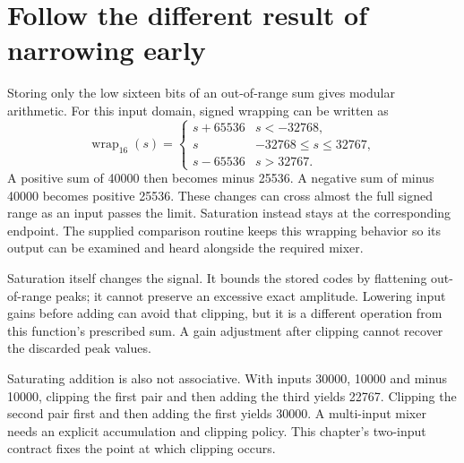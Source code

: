 \section{Follow the different result of narrowing early}\label{pcm-wrapping}
Storing only the low sixteen bits of an out-of-range sum gives modular arithmetic.
For this input domain, signed wrapping can be written as
\[
  \operatorname{wrap}_{16}(s)=
  \begin{cases}
    s+65536 & s<-32768,              \\
    s       & -32768\leq s\leq32767, \\
    s-65536 & s>32767.
  \end{cases}
\]
A positive sum of 40000 then becomes minus 25536. A negative sum of minus 40000
becomes positive 25536. These changes can cross almost the full signed range as
an input passes the limit. Saturation instead stays at the corresponding endpoint.
The supplied comparison routine keeps this wrapping behavior so its output can be
examined and heard alongside the required mixer.

Saturation itself changes the signal. It bounds the stored codes by flattening
out-of-range peaks; it cannot preserve an excessive exact amplitude. Lowering input
gains before adding can avoid that clipping, but it is a different operation from
this function's prescribed sum. A gain adjustment after clipping cannot recover
the discarded peak values.

Saturating addition is also not associative. With inputs 30000, 10000 and minus
10000, clipping the first pair and then adding the third yields 22767. Clipping
the second pair first and then adding the first yields 30000. A multi-input mixer
needs an explicit accumulation and clipping policy. This chapter's two-input
contract fixes the point at which clipping occurs.
